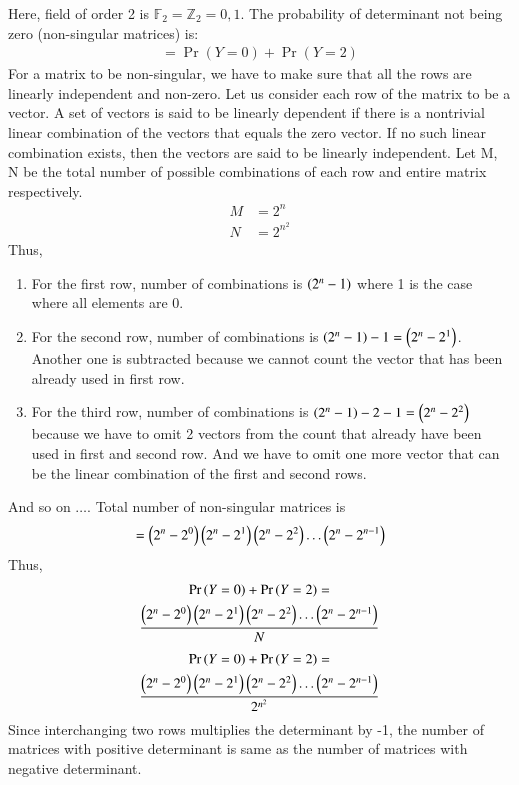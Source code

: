 \documentclass[journal,12pt,twocolumn]{IEEEtran}
\begin{document}
Here, field of order 2 is $\mathbb{F}_2 = \mathbb{Z}_2 = {0, 1}$. The probability of determinant not being zero (non-singular matrices) is:
\begin{align}
    = \Pr{(Y=0)} + \Pr{(Y=2)}
\end{align}
For a matrix to be non-singular, we have to make sure that all the rows are linearly independent and non-zero. Let us consider each row of the matrix to be a vector. A set of vectors is said to be linearly dependent if there is a nontrivial linear combination of the vectors that equals the zero vector. If no such linear combination exists, then the vectors are said to be linearly independent. Let M, N be the total number of possible combinations of each row and entire matrix respectively.
\begin{align}
    M &= 2^{n}
    \\ N &= 2^{n^2}
\end{align}
Thus,
\begin{enumerate}
    \item For the first row, number of combinations is $\left(2^n-1\right)$ where 1 is the case where all elements are 0.
    \item For the second row, number of combinations is $\left(2^n-1\right) - 1 = \left(2^n-2^1\right)$. Another one is subtracted because we cannot count the vector that has been already used in first row.
    \item For the third row, number of combinations is $\left(2^n-1\right) - 2-1 = \left(2^n-2^2\right)$ because we have to omit 2 vectors from the count that already have been used in first and second row. And we have to omit one more vector that can be the linear combination of the first and second rows.
\end{enumerate}
And so on $\hdots$. Total number of non-singular matrices is
\begin{align}
    =\left(2^n-2^0\right)\left(2^n-2^1\right)\left(2^n-2^2\right)\hdots\left(2^n-2^{n-1}\right)
\end{align}
Thus,
\begin{multline}
    \Pr{(Y=0)} + \Pr{(Y=2)} = \\\frac{\left(2^n-2^0\right)\left(2^n-2^1\right)\left(2^n-2^2\right)\hdots\left(2^n-2^{n-1}\right)}{N}
\end{multline}
\begin{multline}
     \Pr{(Y=0)} + \Pr{(Y=2)} = 
     \\\frac{\left(2^n-2^0\right)\left(2^n-2^1\right)\left(2^n-2^2\right)\hdots\left(2^n-2^{n-1}\right)}{2^{n^2}} \label{equation 1}
\end{multline}
Since interchanging two rows multiplies the determinant by -1, the number of matrices with positive determinant is same as the number of matrices with negative determinant.
\end{document}
